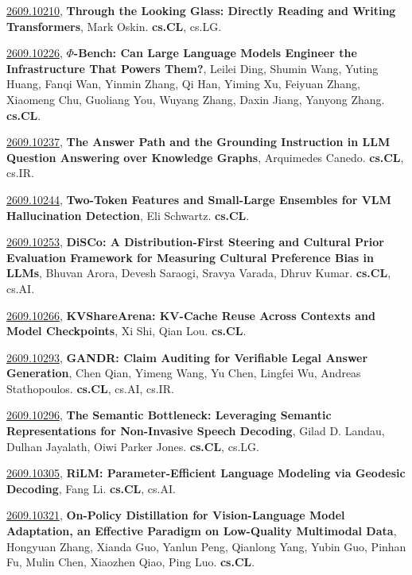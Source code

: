 \documentclass[9pt, a4paper]{article}
\theoremstyle{plain}
\theoremstyle{definition}
\theoremstyle{remark}
\newcommand{\arxivwithtarget}[3]{\hypertarget{#1}{}\href{https://arxiv.org/abs/#1}{#1}, \textbf{\textcolor{arxivblue}{#2}}, #3. }
\begin{document}
\arxivwithtarget{2609.10210}{Through the Looking Glass: Directly Reading and Writing Transformers}{Mark Oskin}\textbf{cs.CL}, cs.LG.



\arxivwithtarget{2609.10226}{$Φ$-Bench: Can Large Language Models Engineer the Infrastructure That Powers Them?}{Leilei Ding, Shumin Wang, Yuting Huang, Fanqi Wan, Yinmin Zhang, Qi Han, Yiming Xu, Feiyuan Zhang, Xiaomeng Chu, Guoliang You, Wuyang Zhang, Daxin Jiang, Yanyong Zhang}\textbf{cs.CL}.



\arxivwithtarget{2609.10237}{The Answer Path and the Grounding Instruction in LLM Question Answering over Knowledge Graphs}{Arquimedes Canedo}\textbf{cs.CL}, cs.IR.



\arxivwithtarget{2609.10244}{Two-Token Features and Small-Large Ensembles for VLM Hallucination Detection}{Eli Schwartz}\textbf{cs.CL}.



\arxivwithtarget{2609.10253}{DiSCo: A Distribution-First Steering and Cultural Prior Evaluation Framework for Measuring Cultural Preference Bias in LLMs}{Bhuvan Arora, Devesh Saraogi, Sravya Varada, Dhruv Kumar}\textbf{cs.CL}, cs.AI.



\arxivwithtarget{2609.10266}{KVShareArena: KV-Cache Reuse Across Contexts and Model Checkpoints}{Xi Shi, Qian Lou}\textbf{cs.CL}.



\arxivwithtarget{2609.10293}{GANDR: Claim Auditing for Verifiable Legal Answer Generation}{Chen Qian, Yimeng Wang, Yu Chen, Lingfei Wu, Andreas Stathopoulos}\textbf{cs.CL}, cs.AI, cs.IR.



\arxivwithtarget{2609.10296}{The Semantic Bottleneck: Leveraging Semantic Representations for Non-Invasive Speech Decoding}{Gilad D. Landau, Dulhan Jayalath, Oiwi Parker Jones}\textbf{cs.CL}, cs.LG.



\arxivwithtarget{2609.10305}{RiLM: Parameter-Efficient Language Modeling via Geodesic Decoding}{Fang Li}\textbf{cs.CL}, cs.AI.



\arxivwithtarget{2609.10321}{On-Policy Distillation for Vision-Language Model Adaptation, an Effective Paradigm on Low-Quality Multimodal Data}{Hongyuan Zhang, Xianda Guo, Yanlun Peng, Qianlong Yang, Yubin Guo, Pinhan Fu, Mulin Chen, Xiaozhen Qiao, Ping Luo}\textbf{cs.CL}.
\end{document}
